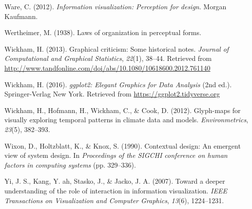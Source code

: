 \documentclass[print]{nuthesis}
\newlength{\cslhangindent}
\newenvironment{CSLReferences}[2]%
{\setlength{\parindent}{0pt}%
\everypar{\setlength{\hangindent}{\cslhangindent}}\ignorespaces}%
{\par}
\begin{document}
\begin{CSLReferences}{1}{0}
\leavevmode\hypertarget{ref-ware2012}{}%
Ware, C. (2012). \emph{Information visualization: Perception for design}. Morgan Kaufmann.

\leavevmode\hypertarget{ref-wertheimer1938}{}%
Wertheimer, M. (1938). Laws of organization in perceptual forms.

\leavevmode\hypertarget{ref-stat_graph_hist}{}%
Wickham, H. (2013). Graphical criticism: Some historical notes. \emph{Journal of Computational and Graphical Statistics}, \emph{22}(1), 38--44. Retrieved from \url{http://www.tandfonline.com/doi/abs/10.1080/10618600.2012.761140}

\leavevmode\hypertarget{ref-ggplot2}{}%
Wickham, H. (2016). \emph{{ggplot2: Elegant Graphics for Data Analysis}} (2nd ed.). Springer-Verlag New York. Retrieved from \url{https://ggplot2.tidyverse.org}

\leavevmode\hypertarget{ref-wickham2012}{}%
Wickham, H., Hofmann, H., Wickham, C., \& Cook, D. (2012). Glyph-maps for visually exploring temporal patterns in climate data and models. \emph{Environmetrics}, \emph{23}(5), 382--393.

\leavevmode\hypertarget{ref-wixon1990}{}%
Wixon, D., Holtzblatt, K., \& Knox, S. (1990). Contextual design: An emergent view of system design. In \emph{Proceedings of the SIGCHI conference on human factors in computing systems} (pp. 329--336).

\leavevmode\hypertarget{ref-yi2007}{}%
Yi, J. S., Kang, Y. ah, Stasko, J., \& Jacko, J. A. (2007). Toward a deeper understanding of the role of interaction in information visualization. \emph{IEEE Transactions on Visualization and Computer Graphics}, \emph{13}(6), 1224--1231.

\end{CSLReferences}


\backmatter

% 






\end{document}
